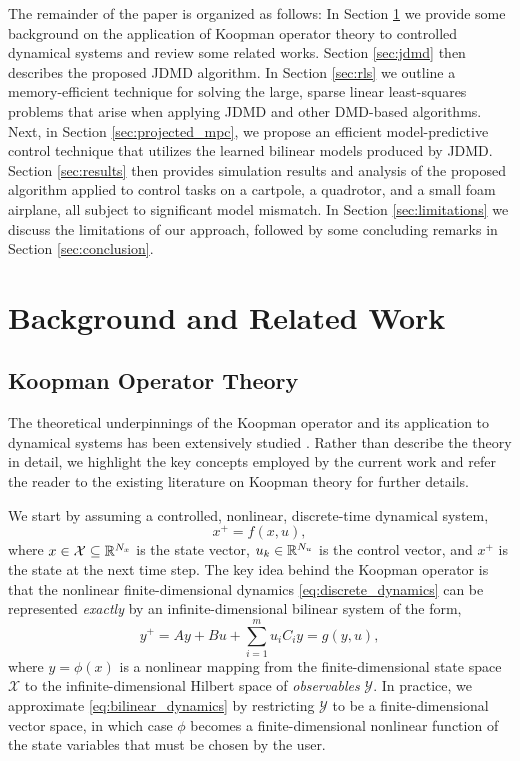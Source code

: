 \documentclass{article}
\begin{document}
The remainder of the paper is organized as follows: In Section
\ref{sec:Preliminaries/Background} we provide some background on the application of Koopman
operator theory to controlled dynamical systems and review some related works.  Section
\ref{sec:jdmd} then describes the proposed JDMD algorithm.  In Section \ref{sec:rls} we
outline a memory-efficient technique for solving the large, sparse linear least-squares
problems that arise when applying JDMD and other DMD-based algorithms.  Next, in Section
\ref{sec:projected_mpc}, we propose an efficient model-predictive control technique that
utilizes the learned bilinear models produced by JDMD.  Section \ref{sec:results} then
provides simulation results and analysis of the proposed algorithm applied to control tasks
on a cartpole, a quadrotor, and a small foam airplane, all subject to significant model
mismatch.  In Section \ref{sec:limitations} we discuss the limitations of our approach,
followed by some concluding remarks in Section \ref{sec:conclusion}.

\section{Background and Related Work} \label{sec:Preliminaries/Background}

\subsection{Koopman Operator Theory}

The theoretical underpinnings of the Koopman operator and its application to dynamical
systems has been extensively studied \cite{Fasel2021,Proctor2018,Bruder2021,Williams2015}.
Rather than describe the theory in detail, we highlight the key concepts employed by the
current work and refer the reader to the existing literature on Koopman theory for further
details.

We start by assuming a controlled, nonlinear, discrete-time dynamical system,
\begin{equation} \label{eq:discrete_dynamics} 
  x^+ = f(x, u), 
\end{equation} 
where $x \in \mathcal{X} \subseteq \mathbb{R}^{N_x}$ is the state vector, $u_k \in \mathbb{R}^{N_u}$ is the
control vector, and $x^+$ is the state at the next time step.  The key idea behind the
Koopman operator is that the nonlinear finite-dimensional dynamics
\eqref{eq:discrete_dynamics} can be represented \emph{exactly} by an infinite-dimensional
bilinear system of the form,
\begin{equation} \label{eq:bilinear_dynamics}
  y^+ = A y + B u + \sum_{i=1}^m u_i C_i y = g(y,u) ,
\end{equation}
where $y = \phi(x)$ is a nonlinear mapping from the finite-dimensional state space
$\mathcal{X}$ to the infinite-dimensional Hilbert space of \textit{observables}
$\mathcal{Y}$.  In practice, we approximate \eqref{eq:bilinear_dynamics} by restricting
$\mathcal{Y}$ to be a finite-dimensional vector space, in which case $\phi$ becomes a
finite-dimensional nonlinear function of the state variables that must be chosen by the
user.
\end{document}
